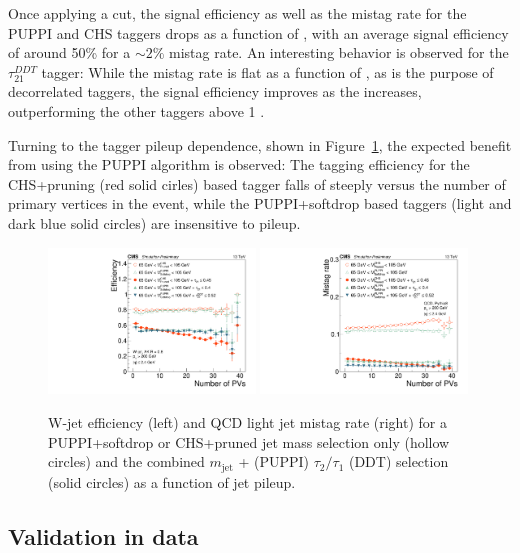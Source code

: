 Once applying a \nsubj cut, the signal efficiency as well as the mistag rate for the PUPPI \nsubj and CHS \nsubj taggers drops as a function of \PT, with an average signal efficiency of around 50\% for a $\sim 2\%$ mistag rate. An interesting behavior is observed for the $\tau_{21}^{DDT}$ tagger: While the mistag rate is flat as a function of \PT, as is the purpose of decorrelated taggers, the signal efficiency improves as the \PT increases, outperforming the other taggers above 1 \TeV. \par
Turning to the tagger pileup dependence, shown in Figure~\ref{fig:searchII:effvspu}, the expected benefit from using the PUPPI algorithm is observed: The tagging efficiency for the CHS+pruning (red solid cirles) based tagger falls of steeply versus the number of primary vertices in the event, while the PUPPI+softdrop based taggers (light and dark blue solid circles) are insensitive to pileup.


\begin{figure}[htbp]
\centering
\includegraphics[width=0.49\textwidth]{figures/vtagging/JME-16-003/BoostedW/WtagSigEffvsNPV.pdf}
\includegraphics[width=0.49\textwidth]{figures/vtagging/JME-16-003/BoostedW/QCDBkgEffvsNPV.pdf}
\caption{W-jet efficiency (left) and QCD light jet mistag rate (right) for a PUPPI+softdrop or CHS+pruned jet mass selection only (hollow circles) and the combined $m_{\mathrm{jet}}$ + (PUPPI) $\tau_2/\tau_1$ (DDT) selection (solid circles) as a function of jet pileup.}
\label{fig:searchII:effvspu}
\end{figure}

   
\subsection{Validation in data}  
  

